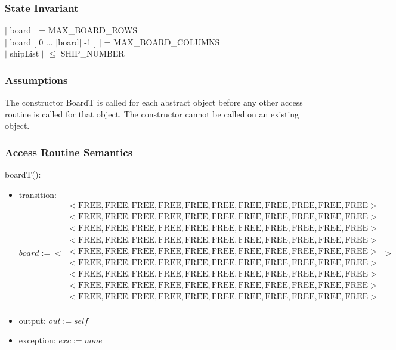 \documentclass[12pt]{article}
\begin{document}
\subsubsection* {State Invariant}

$|$ board $|$ = MAX\_BOARD\_ROWS \\
$|$ board [ 0 ... $|$board$|$ -1 ] $|$ = MAX\_BOARD\_COLUMNS \\
$|$ shipList $|$ $\leq$ SHIP\_NUMBER

\subsubsection* {Assumptions}

The constructor BoardT is called for each abstract object before any other access routine is called for that
object.  The constructor cannot be called on an existing object.

\subsubsection* {Access Routine Semantics}

\noindent boardT():
\begin{itemize}
\item transition: 
$$ board := 
< \begin{array}{c}
< \mbox{FREE}, \mbox{FREE}, \mbox{FREE}, \mbox{FREE}, \mbox{FREE}, \mbox{FREE}, \mbox{FREE}, \mbox{FREE}, \mbox{FREE}, \mbox{FREE}, \mbox{FREE} >\\
< \mbox{FREE}, \mbox{FREE}, \mbox{FREE}, \mbox{FREE}, \mbox{FREE}, \mbox{FREE}, \mbox{FREE}, \mbox{FREE}, \mbox{FREE}, \mbox{FREE}, \mbox{FREE} >\\
< \mbox{FREE}, \mbox{FREE}, \mbox{FREE}, \mbox{FREE}, \mbox{FREE}, \mbox{FREE}, \mbox{FREE}, \mbox{FREE}, \mbox{FREE}, \mbox{FREE}, \mbox{FREE} >\\
< \mbox{FREE}, \mbox{FREE}, \mbox{FREE}, \mbox{FREE}, \mbox{FREE}, \mbox{FREE}, \mbox{FREE}, \mbox{FREE}, \mbox{FREE}, \mbox{FREE}, \mbox{FREE} >\\
< \mbox{FREE}, \mbox{FREE}, \mbox{FREE}, \mbox{FREE}, \mbox{FREE}, \mbox{FREE}, \mbox{FREE}, \mbox{FREE}, \mbox{FREE}, \mbox{FREE}, \mbox{FREE} >\\
< \mbox{FREE}, \mbox{FREE}, \mbox{FREE}, \mbox{FREE}, \mbox{FREE}, \mbox{FREE}, \mbox{FREE}, \mbox{FREE}, \mbox{FREE}, \mbox{FREE}, \mbox{FREE} >\\
< \mbox{FREE}, \mbox{FREE}, \mbox{FREE}, \mbox{FREE}, \mbox{FREE}, \mbox{FREE}, \mbox{FREE}, \mbox{FREE}, \mbox{FREE}, \mbox{FREE}, \mbox{FREE} >\\
< \mbox{FREE}, \mbox{FREE}, \mbox{FREE}, \mbox{FREE}, \mbox{FREE}, \mbox{FREE}, \mbox{FREE}, \mbox{FREE}, \mbox{FREE}, \mbox{FREE}, \mbox{FREE} >\\
< \mbox{FREE}, \mbox{FREE}, \mbox{FREE}, \mbox{FREE}, \mbox{FREE}, \mbox{FREE}, \mbox{FREE}, \mbox{FREE}, \mbox{FREE}, \mbox{FREE}, \mbox{FREE} >\\
\end{array} >
$$
\item output: $out := \mathit{self}$
\item exception: $exc := none $
\end{itemize}
\end{document}
